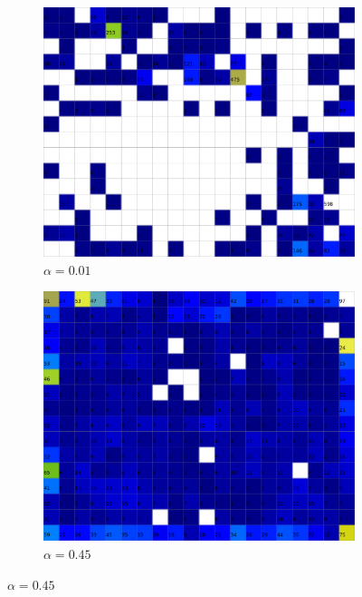 \documentclass{acm_proc_article-sp}
\begin{document}
\begin{figure}
\centering
    \centering
    \begin{subfigure}[b]{0.24\linewidth}
        \includegraphics[width=\linewidth]{img/wine-20x16-quantization-error-alpha-0,01}
        \caption{$\alpha=0.01$}
        \label{fig:wine-20x16-quantization-error-alpha-0,01}
    \end{subfigure}
    \begin{subfigure}[b]{0.24\linewidth}
        \includegraphics[width=\linewidth]{img/wine-20x16-quantization-error-alpha-0,45}
        \caption{$\alpha=0.45$}
        \label{fig:wine-20x16-quantization-error-alpha-0,45}

\end{subfigure}
\end{figure}
\end{document}
